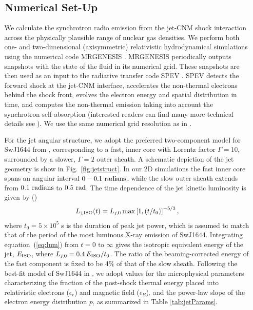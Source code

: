 \documentclass[usenatbib,fleqn]{mnras}
\begin{document}
\subsection{Numerical Set-Up}
\label{sec:numerical}
We calculate the synchrotron radio emission from the jet-CNM shock
interaction across the physically plausible range of nuclear gas
densities.  We perform both one- and two-dimensional (axisymmetric)
relativistic hydrodynamical simulations using the numerical code
MRGENESIS \citep{MimicaGianniosAloy2009}. MRGENESIS periodically
outputs snapshots with the state of the fluid in its numerical
grid. These snapshots are then used as an input to the radiative
transfer code SPEV \citep{Mimica+2009}. SPEV detects the forward shock
at the jet-CNM interface, accelerates the non-thermal electrons behind
the shock front, evolves the electron energy and spatial distribution
in time, and computes the non-thermal emission taking into account the
synchrotron self-absorption (interested readers can find many more
technical details see \citealt{Mimica+2016}). We use the same
numerical grid resolution as in \citet{Mimica+2015}.

For the jet angular structure, we adopt the preferred two-component
model for SwJ1644 from \citet{Mimica+2015}, corresponding to a fast,
inner core with Lorentz factor $\Gamma = 10$, surrounded by a slower,
$\Gamma=2$ outer sheath. A schematic depiction of the jet geometry is
show in Fig.~\ref{fig:jetstruct}.  In our 2D simulations the fast
inner core spans an angular interval $0-0.1\ {\rm radians}$, while the
slow outer sheath extends from $0.1\ {\rm radians}$ to $0.5\ {\rm
  rad}$.  The time dependence of the jet kinetic luminosity is given
by (\citealt{Mimica+2015})
\begin{equation}\label{eq:lum}
L_{\rm j, ISO}(t) = L_{j,0}\max\left[1, (t/t_0)\right]^{-5/3},
\end{equation}
where $t_0 = 5\times 10^5$ s is the duration of peak jet power, which
is assumed to match that of the period of the most luminous X-ray
emission of SwJ1644.  Integrating equation~(\ref{eq:lum}) from $t = 0$
to $\infty$ gives the isotropic equivalent energy of the jet, $E_{\rm
  ISO}$, where $L_{j,0}=0.4\, E_{\rm ISO}/t_0$.  The ratio of the
beaming-corrected energy of the fast component is fixed to be 4\% of
that of the slow sheath.  Following the best-fit model of SwJ1644 in
\citet{Mimica+2015}, we adopt values for the microphysical parameters
characterizing the fraction of the post-shock thermal energy placed
into relativistic electrons ($\epsilon_e$) and magnetic field
($\epsilon_B$), and the power-law slope of the electron energy
distribution $p$, as summarized in Table \ref{tab:jetParams}.
\end{document}
